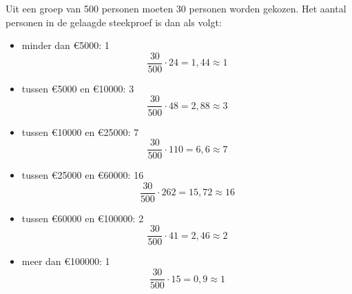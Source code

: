 \begin{antwoord}{1}
Uit een groep van 500 personen moeten 30 personen worden gekozen.
Het aantal personen in de gelaagde steekproef is dan als volgt:
\begin{itemize}
 \item minder dan \euro 5000: 1
 \\ 
 \[ \frac{30}{500} \cdot 24 = 1,44 \approx 1 \]
 \item tussen \euro 5000 en \euro 10000: 3 
 \\ 
 \[ \frac{30}{500} \cdot 48 = 2,88 \approx 3  \]
 \item tussen \euro 10000 en \euro 25000: 7 
 \\ 
 \[ \frac{30}{500} \cdot 110 = 6,6 \approx 7  \]
 \item tussen \euro 25000 en \euro 60000: 16
 \\ 
 \[ \frac{30}{500} \cdot 262 = 15,72  \approx 16 \]
 \item tussen \euro 60000 en \euro 100000: 2 
 \\ 
 \[ \frac{30}{500} \cdot 41 = 2,46  \approx 2  \]
 \item meer dan \euro 100000: 1
 \\ 
 \[ \frac{30}{500} \cdot 15 = 0,9  \approx 1  \]
 \end{itemize}
\end{antwoord}

